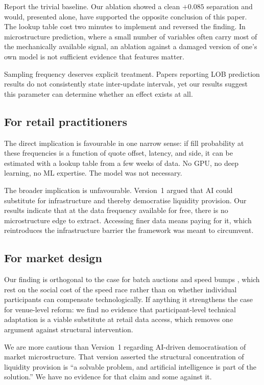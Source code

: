\documentclass[11pt]{article}
\begin{document}
Report the trivial baseline. Our ablation showed a clean $+0.085$ separation and
would, presented alone, have supported the opposite conclusion of this paper.
The lookup table cost two minutes to implement and reversed the finding. In microstructure prediction, where a small number of variables often carry most
of the mechanically available signal, an ablation against a damaged version of
one's own model is not sufficient evidence that features matter.

Sampling frequency deserves explicit treatment. Papers reporting LOB prediction
results do not consistently state inter-update intervals, yet our results
suggest this parameter can determine whether an effect exists at all.

\subsection{For retail practitioners}

The direct implication is favourable in one narrow sense: if fill probability at
these frequencies is a function of quote offset, latency, and side, it can be
estimated with a lookup table from a few weeks of data. No GPU, no deep
learning, no ML expertise. The model was not necessary.

The broader implication is unfavourable. Version~1 argued that AI could
substitute for infrastructure and thereby democratise liquidity provision. Our
results indicate that at the data frequency available for free, there is no
microstructure edge to extract. Accessing finer data means paying for it, which
reintroduces the infrastructure barrier the framework was meant to circumvent.

\subsection{For market design}

Our finding is orthogonal to the case for batch auctions and speed bumps
\citep{budish2015,aquilina2022}, which rest on the social cost of the speed
race rather than on whether individual participants can compensate
technologically. If anything it strengthens the case for venue-level reform: we
find no evidence that participant-level technical adaptation is a viable
substitute at retail data access, which removes one argument against structural
intervention.

We are more cautious than Version~1 regarding AI-driven democratisation of
market microstructure. That version asserted the structural concentration of
liquidity provision is ``a solvable problem, and artificial intelligence is part
of the solution.'' We have no evidence for that claim and some against it.
\end{document}
